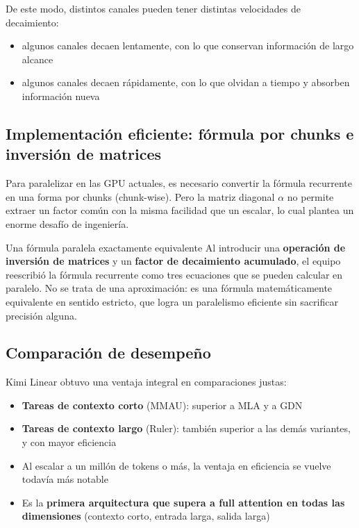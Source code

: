 De este modo, distintos canales pueden tener distintas velocidades de decaimiento:
\begin{itemize}
    \item algunos canales decaen lentamente, con lo que conservan información de largo alcance
    \item algunos canales decaen rápidamente, con lo que olvidan a tiempo y absorben información nueva
\end{itemize}

\subsection{Implementación eficiente: fórmula por chunks e inversión de matrices}

Para paralelizar en las GPU actuales, es necesario convertir la fórmula recurrente en una forma por chunks (chunk-wise). Pero la matriz diagonal $\alpha$ no permite extraer un factor común con la misma facilidad que un escalar, lo cual plantea un enorme desafío de ingeniería.

\begin{importantbox}{Una fórmula paralela exactamente equivalente}
Al introducir una \textbf{operación de inversión de matrices} y un \textbf{factor de decaimiento acumulado}, el equipo reescribió la fórmula recurrente como tres ecuaciones que se pueden calcular en paralelo. No se trata de una aproximación: es una fórmula matemáticamente equivalente en sentido estricto, que logra un paralelismo eficiente sin sacrificar precisión alguna.
\end{importantbox}

\subsection{Comparación de desempeño}

Kimi Linear obtuvo una ventaja integral en comparaciones justas:
\begin{itemize}
    \item \textbf{Tareas de contexto corto} (MMAU): superior a MLA y a GDN
    \item \textbf{Tareas de contexto largo} (Ruler): también superior a las demás variantes, y con mayor eficiencia
    \item Al escalar a un millón de tokens o más, la ventaja en eficiencia se vuelve todavía más notable
    \item Es la \textbf{primera arquitectura que supera a full attention en todas las dimensiones} (contexto corto, entrada larga, salida larga)
\end{itemize}


